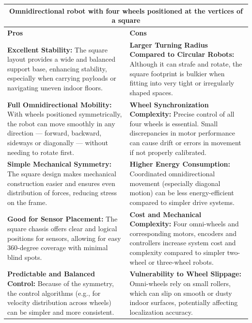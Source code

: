 \begin{table}[H]
\centering
\begin{tabular}{|p{}|p{}|}
\hline
\multicolumn{2}{|c|}{\textbf{Omnidirectional robot with four wheels positioned at the vertices of a square}} \\
\hline
\textbf{Pros} & \textbf{Cons} \\
\hline
\textbf{Excellent Stability:} The square layout provides a wide and balanced support base, enhancing stability, especially when carrying payloads or navigating uneven indoor floors. & \textbf{Larger Turning Radius Compared to Circular Robots:} Although it can strafe and rotate, the square footprint is bulkier when fitting into very tight or irregularly shaped spaces. \\
\hline
\textbf{Full Omnidirectional Mobility:} With wheels positioned symmetrically, the robot can move smoothly in any direction — forward, backward, sideways or diagonally — without needing to rotate first. & \textbf{Wheel Synchronization Complexity:} Precise control of all four wheels is essential. Small discrepancies in motor performance can cause drift or errors in movement if not properly calibrated. \\
\hline
\textbf{Simple Mechanical Symmetry:} The square design makes mechanical construction easier and ensures even distribution of forces, reducing stress on the frame. & \textbf{Higher Energy Consumption:} Coordinated omnidirectional movement (especially diagonal motion) can be less energy-efficient compared to simpler drive systems. \\
\hline
\textbf{Good for Sensor Placement:} The square chassis offers clear and logical positions for sensors, allowing for easy 360-degree coverage with minimal blind spots. & \textbf{Cost and Mechanical Complexity:} Four omni-wheels and corresponding motors, encoders and controllers increase system cost and complexity compared to simpler two-wheel or three-wheel robots. \\
\hline
\textbf{Predictable and Balanced Control:} Because of the symmetry, the control algorithms (e.g., for velocity distribution across wheels) can be simpler and more consistent. & \textbf{Vulnerability to Wheel Slippage:} Omni-wheels rely on small rollers, which can slip on smooth or dusty indoor surfaces, potentially affecting localization accuracy. \\
\hline
\end{tabular}
\end{table}


